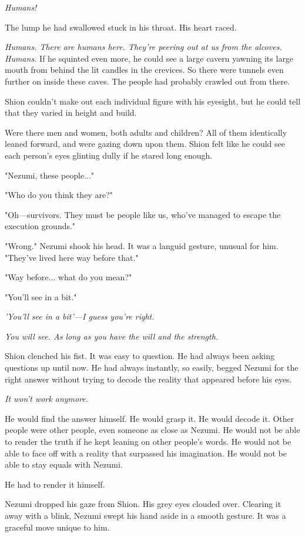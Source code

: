 \emph{Humans!}

The lump he had swallowed stuck in his throat. His heart raced.

\emph{Humans. There are humans here. They're peering out at us from the
alcoves. Humans.} If he squinted even more, he could see a large cavern
yawning its large mouth from behind the lit candles in the crevices. So
there were tunnels even further on inside these caves. The people had
probably crawled out from there.

Shion couldn't make out each individual figure with his eyesight, but he
could tell that they varied in height and build.

Were there men and women, both adults and children? All of them
identically leaned forward, and were gazing down upon them. Shion felt
like he could see each person's eyes glinting dully if he stared long
enough.

"Nezumi, these people..."

"Who do you think they are?"

"Oh---survivors. They must be people like us, who've managed to escape the
execution grounds."

"Wrong." Nezumi shook his head. It was a languid gesture, unusual for
him. "They've lived here way before that."

"Way before... what do you mean?"

"You'll see in a bit."

\emph{'You'll see in a bit'---I guess you're right.}

\emph{You will see. As long as you have the will and the strength.}

Shion clenched his fist. It was easy to question. He had always been
asking questions up until now. He had always instantly, so easily,
begged Nezumi for the right answer without trying to decode the reality
that appeared before his eyes.

\emph{It won't work anymore.}

He would find the answer himself. He would grasp it. He would decode it.
Other people were other people, even someone as close as Nezumi. He
would not be able to render the truth if he kept leaning on other
people's words. He would not be able to face off with a reality that
surpassed his imagination. He would not be able to stay equals with
Nezumi.

He had to render it himself.

Nezumi dropped his gaze from Shion. His grey eyes clouded over. Clearing
it away with a blink, Nezumi swept his hand aside in a smooth gesture.
It was a graceful move unique to him.

